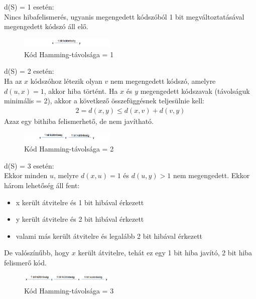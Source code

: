 \documentclass[margin=0px]{article}
\begin{document}
\begin{description}
\begin{itemize}
                  d(S) = 1 esetén: \\
                  Nincs hibafelismerés, ugyanis megengedett kódszóból 1 bit megváltoztatásával megengedett kódszó áll elő.
                  \begin{figure}[H]
                      \centering
                      \includegraphics[width=0.4\textwidth]{img/hamming1.png}
                      \caption{Kód Hamming-távolsága = 1}
                  \end{figure}
                  d(S) = 2 esetén: \\
                  Ha az $x$ kódszóhoz létezik olyan $v$ nem megengedett kódszó, amelyre $d(u,x)=1$, akkor hiba történt. Ha $x$ és $y$ megengedett kódszavak (távolságuk minimális = 2), akkor a következő összefüggésnek teljesülnie kell:
                  \begin{align*}
                      2 = d(x,y) \leq d(x,v)+d(v,y)
                  \end{align*}
                  Azaz egy bithiba felismerhető, de nem javítható.
                  \begin{figure}[H]
                      \centering
                      \includegraphics[width=0.4\textwidth]{img/hamming2.png}
                      \caption{Kód Hamming-távolsága = 2}
                  \end{figure}

                  d(S) = 3 esetén: \\
                  Ekkor minden $u$, melyre $d(x,u)=1$ és $d(u,y) > 1$ nem megengedett. Ekkor három lehetőség áll fent:
                  \begin{itemize}
                      \item x került átvitelre és 1 bit hibával érkezett
                      \item y került átvitelre és 2 bit hibával érkezett
                      \item valami más került átvitelre és legalább 2 bit hibával érkezett
                  \end{itemize}
                  De valószínűbb, hogy $x$ került átvitelre, tehát ez egy 1 bit hiba javító, 2 bit hiba felismerő kód.
                  \begin{figure}[H]
                      \centering
                      \includegraphics[width=0.4\textwidth]{img/hamming3.png}
                      \caption{Kód Hamming-távolsága = 3}
                  \end{figure}


\end{itemize}
\end{description}
\end{document}
